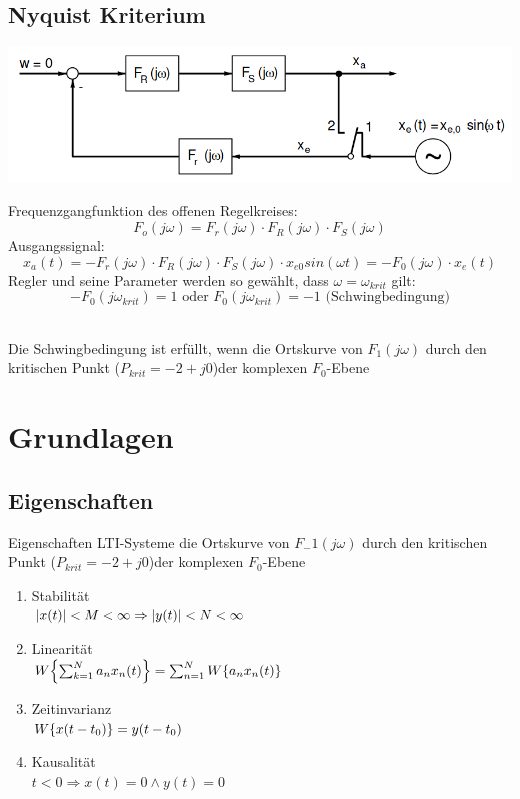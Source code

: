 \documentclass[10pt,a4paper]{article}
\begin{document}
\subsection{Nyquist Kriterium}
    \begin{center}
      \includegraphics[width=.45\textwidth]{Figures/Nyquist.png}
    \end{center}
    Frequenzgangfunktion des offenen Regelkreises:
    \[ F_o (j\omega) = F_r (j\omega) \cdot F_R (j\omega) \cdot F_S (j\omega)\]
    Ausgangssignal:
    \[ x_a(t)=-F_r (j\omega) \cdot F_R (j\omega) \cdot F_S (j\omega) \cdot x_{e0} sin(\omega t)=
    -F_0 (j\omega) \cdot x_e (t)\]
    Regler und seine Parameter werden so gewählt, dass $\omega = \omega_{krit}$ gilt:
    \[-F_0 (j\omega_{krit})=1 \text{ oder } F_0 (j\omega_{krit})=-1 \text{ (Schwingbedingung)}\]\
    \begin{mdframed}[style=exercise]
        Die Schwingbedingung ist erfüllt, wenn die Ortskurve von $F_1 (j\omega)$ durch den kritischen
         Punkt ($P_{krit} = -2+j0$)der komplexen $F_0$-Ebene



    \end{mdframed}
\section{Grundlagen}
  \subsection{Eigenschaften}
  Eigenschaften LTI-Systeme die Ortskurve von $F_-1 (j\omega)$ durch den kritischen
  Punkt ($P_{krit} = -2+j0$)der komplexen $F_0$-Ebene
  \begin{mdframed}[style=exercise]
    \begin{enumerate}
      \item Stabilität\\
      $\abs{x(t)} < M < \infty \Rightarrow \abs{y(t)} < N < \infty$
      \item Linearität\\
      $W\qty{\sum_{k=1}^{N}a_n x_n(t)}=\sum_{n=1}^{N}W\qty{a_n x_n(t)}$
      \item Zeitinvarianz\\
      $W\qty{x(t-t_0)} =y(t-t_0)$
      \item Kausalität\\
      $t < 0 \Rightarrow x(t)=0 \land y(t)=0$
    \end{enumerate}
  \end{mdframed}
\end{document}
